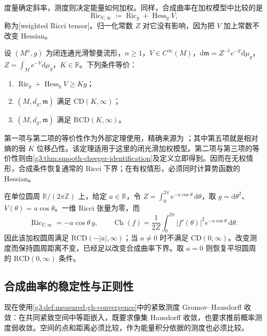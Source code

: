 度量确定斜率，测度则决定能量如何加权。同样，合成曲率在加权模型中比较的是
\begin{equation}\label{g3:eq:weighted-ricci-infinity}
	\operatorname{Ric}_{V,\infty}\coloneqq
	\operatorname{Ric}_g+\operatorname{Hess}_gV,
\end{equation}
称为[weighted Ricci tensor]。归一化常数 \(Z\) 对它没有影响，因为把 \(V\) 加上常数不改变 Hessian。

\begin{theorem}\label{g3:thm:smooth-cd-rcd-comparison}
	设 \((M^n,g)\) 为闭连通光滑黎曼流形，\(n\ge1\)，\(V\in C^\infty(M)\)，\(\mathrm d\mathfrak m=Z^{-1}e^{-V}\mathrm d\mu_g\)，\(Z=\int_Me^{-V}\mathrm d\mu_g\)，\(K\in\mathbb R\)。下列条件等价：
	\begin{enumerate}
		\item \(\operatorname{Ric}_g+\operatorname{Hess}_gV\ge Kg\)；
		\item \((M,d_g,\mathfrak m)\) 满足 \(\mathrm{CD}(K,\infty)\)；
		\item \((M,d_g,\mathfrak m)\) 满足 \(\mathrm{RCD}(K,\infty)\)。
	\end{enumerate}
\end{theorem}

第一项与第二项的等价性作为外部定理使用，精确来源为 \cite[定理7.3(b)，第948--949页]{LottVillani2009Transport}；其中第五项就是相对熵的弱 \(K\) 位移凸性。该定理适用于这里的闭光滑加权模型。第二项与第三项的等价性则由\cref{g3:thm:smooth-cheeger-identification}及定义立即得到。因而在无权情形，合成条件恢复通常的 Ricci 下界；在有权情形，必须同时计算势函数的 Hessian。

\begin{example}\label{g3:exm:weighted-circle-synthetic-curvature}
	在单位圆周 \(\mathbb R/(2\pi\mathbb Z)\) 上，给定 \(a\in\mathbb R\)，令 \(Z=\int_0^{2\pi}e^{-a\cos\theta}\,\mathrm d\theta\)，取 \(g=\mathrm d\theta^2\)、\(V(\theta)=a\cos\theta\)。一维 Ricci 张量为零，而
	\[
		\operatorname{Ric}_{V,\infty}=-a\cos\theta\,g,
		\qquad
		\operatorname{Ch}(f)=\frac1{2Z}\int_0^{2\pi}|f'(\theta)|^2e^{-a\cos\theta}\,\mathrm d\theta.
	\]
	因此该加权圆周满足 \(\mathrm{RCD}(-|a|,\infty)\)；当 \(a\ne0\) 时不满足 \(\mathrm{CD}(0,\infty)\)。改变测度而保持圆周距离不变，已经足以改变合成曲率下界。取 \(a=0\) 则恢复平坦圆周的 \(\mathrm{RCD}(0,\infty)\) 条件。
\end{example}

\subsection{合成曲率的稳定性与正则性}
\label{g3:subsec:2904:04}
现在使用\cref{g3:def:measured-gh-convergence}中的紧致测度 Gromov--Hausdorff 收敛：在共同紧致空间中等距嵌入，既要求像集 Hausdorff 收敛，也要求推前概率测度弱收敛。空间的点和距离必须比较，作为能量积分依据的测度也必须比较。

